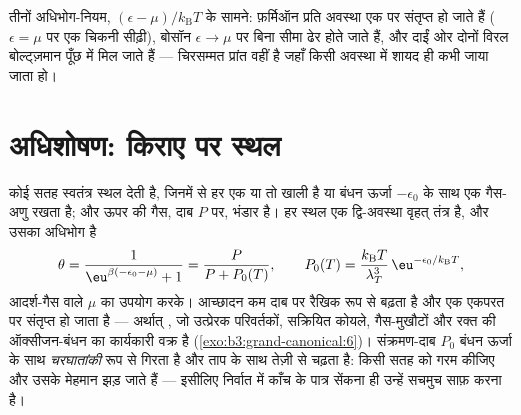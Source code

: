 \begin{omfigure}

{\small तीनों अधिभोग-नियम, $(\epsilon -
\mu)/k_{\text{B}}T$ के सामने: फ़र्मिऑन प्रति अवस्था एक पर संतृप्त हो
जाते हैं ($\epsilon = \mu$ पर एक चिकनी सीढ़ी), बोसॉन
$\epsilon \to \mu$ पर बिना सीमा ढेर होते जाते हैं, और दाईं ओर दोनों
विरल बोल्ट्ज़मान पूँछ में मिल जाते हैं --- चिरसम्मत प्रांत वहीं है
जहाँ किसी अवस्था में शायद ही कभी जाया जाता हो।}
\end{omfigure}

\section{अधिशोषण: किराए पर स्थल}

\begin{proposition}[लांगम्यूर समतापी]\label{prop:b3:grand-canonical:langmuir}
कोई सतह स्वतंत्र स्थल देती है, जिनमें से हर एक या तो खाली है या
बंधन ऊर्जा $-\epsilon_0$ के साथ एक गैस-अणु रखता है; और ऊपर की गैस,
दाब $P$ पर, भंडार है। हर स्थल एक द्वि-अवस्था वृहत्
तंत्र है, और उसका अधिभोग है
\[
\theta = \frac{1}{\eu^{\beta(-\epsilon_0 - \mu)} + 1}
 = \frac{P}{P + P_0(T)} , \qquad
P_0(T) = \frac{k_{\text{B}}T}{\lambda_T^3}\,
\eu^{-\epsilon_0/k_{\text{B}}T} ,
\]
आदर्श-गैस वाले $\mu$ का उपयोग करके। आच्छादन कम दाब पर रैखिक रूप से
बढ़ता है और एक एकपरत पर संतृप्त हो जाता है --- अर्थात् \emph{}, जो उत्प्रेरक परिवर्तकों, सक्रियित
कोयले, गैस-मुखौटों और रक्त की ऑक्सीजन-बंधन का कार्यकारी वक्र है
(\cref{exo:b3:grand-canonical:6})। संक्रमण-दाब $P_0$
बंधन ऊर्जा के साथ \emph{चरघातांकी} रूप से गिरता है और ताप के साथ
तेज़ी से चढ़ता है: किसी सतह को गरम कीजिए और उसके मेहमान झड़ जाते हैं
--- इसीलिए निर्वात में काँच के पात्र सेंकना ही उन्हें सचमुच साफ़ करना है।
\end{proposition}

